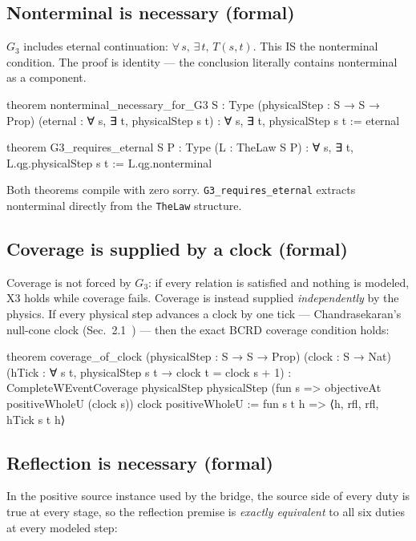 \documentclass[11pt,a4paper]{article}
\theoremstyle{definition}
\theoremstyle{remark}
\begin{document}
\subsection{Nonterminal is necessary (formal)}

$G_3$ includes eternal continuation: $\forall\, s,\, \exists\, t,\, T(s,t)$. This IS the nonterminal condition. The proof is identity --- the conclusion literally contains nonterminal as a component.

\begin{leancode}
theorem nonterminal_necessary_for_G3 {S : Type}
    (physicalStep : S → S → Prop)
    (eternal : ∀ s, ∃ t, physicalStep s t) :
    ∀ s, ∃ t, physicalStep s t :=
  eternal

theorem G3_requires_eternal {S P : Type} (L : TheLaw S P) :
    ∀ s, ∃ t, L.qg.physicalStep s t :=
  L.qg.nonterminal
\end{leancode}

Both theorems compile with zero sorry. \texttt{G3\_requires\_eternal} extracts nonterminal directly from the \texttt{TheLaw} structure.

\subsection{Coverage is supplied by a clock (formal)}

Coverage is not forced by $G_3$: if every relation is satisfied and nothing is modeled, X3 holds while coverage fails. Coverage is instead supplied \emph{independently} by the physics. If every physical step advances a clock by one tick --- Chandrasekaran's null-cone clock (Sec.~2.1~\cite{chandrasekaran2026}) --- then the exact BCRD coverage condition holds:

\begin{leancode}
theorem coverage_of_clock (physicalStep : S → S → Prop) (clock : S → Nat)
    (hTick : ∀ s t, physicalStep s t → clock t = clock s + 1) :
    CompleteWEventCoverage physicalStep physicalStep
      (fun s => objectiveAt positiveWholeU (clock s)) clock positiveWholeU :=
  fun s t h => ⟨h, rfl, rfl, hTick s t h⟩
\end{leancode}

\subsection{Reflection is necessary (formal)}

In the positive source instance used by the bridge, the source side of every duty is true at every stage, so the reflection premise is \emph{exactly equivalent} to all six duties at every modeled step:
\end{document}
